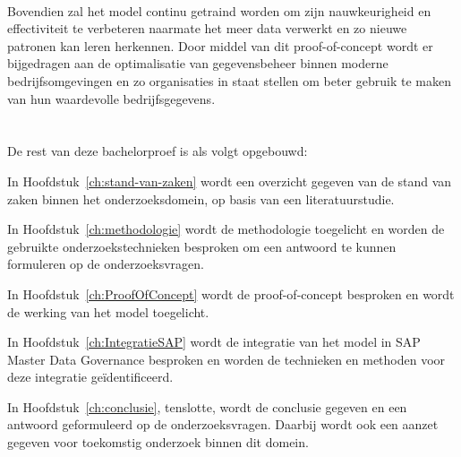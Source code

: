 \\
Bovendien zal het model continu getraind worden om zijn nauwkeurigheid en effectiviteit te verbeteren naarmate het meer data verwerkt en zo nieuwe patronen kan leren herkennen. Door middel van dit proof-of-concept wordt er bijgedragen aan de optimalisatie van gegevensbeheer binnen moderne bedrijfsomgevingen en zo organisaties in staat stellen om beter gebruik te maken van hun waardevolle bedrijfsgegevens.

\section{}%
\label{sec:opzet-bachelorproef}


De rest van deze bachelorproef is als volgt opgebouwd:

In Hoofdstuk~\ref{ch:stand-van-zaken} wordt een overzicht gegeven van de stand van zaken binnen het onderzoeksdomein, op basis van een literatuurstudie.

In Hoofdstuk~\ref{ch:methodologie} wordt de methodologie toegelicht en worden de gebruikte onderzoekstechnieken besproken om een antwoord te kunnen formuleren op de onderzoeksvragen.

In Hoofdstuk~\ref{ch:ProofOfConcept} wordt de proof-of-concept besproken en wordt de werking van het model toegelicht.

In Hoofdstuk~\ref{ch:IntegratieSAP} wordt de integratie van het model in SAP Master Data Governance besproken en worden de technieken en methoden voor deze integratie geïdentificeerd.

In Hoofdstuk~\ref{ch:conclusie}, tenslotte, wordt de conclusie gegeven en een antwoord geformuleerd op de onderzoeksvragen. Daarbij wordt ook een aanzet gegeven voor toekomstig onderzoek binnen dit domein.